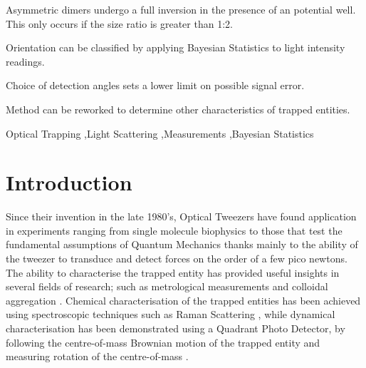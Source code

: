 \documentclass[final, 3p]{elsarticle}
\begin{document}
\begin{frontmatter}
\begin{highlights}
\item Asymmetric dimers undergo a full inversion in the presence of an potential well. This only occurs if the size ratio is greater than 1:2.  
\item Orientation can be classified by applying Bayesian Statistics to light intensity readings. 
\item Choice of detection angles sets a lower limit on possible signal error. 
\item Method can be reworked to determine other characteristics of trapped entities. 
\end{highlights}

\begin{keyword}
	Optical Trapping \sep Light Scattering \sep Measurements \sep Bayesian Statistics 
\end{keyword}

\end{frontmatter}


\section{Introduction}
\label{sec:Intro}

Since their invention in the late 1980's, Optical Tweezers have found application in experiments ranging from single molecule biophysics \cite{Bustamante2021Biophysics} to those that test the fundamental assumptions of Quantum Mechanics \cite{yin2013large} thanks mainly to the ability of the tweezer to transduce and detect forces on the order of a few pico newtons. The ability to characterise the trapped entity has provided useful insights in several fields of research; such as metrological measurements \cite{arita2020coherent} and colloidal aggregation \cite{burns1990optical}. Chemical characterisation of the trapped entities has been achieved using spectroscopic techniques such as Raman Scattering \cite{gupta2014raman}, while dynamical characterisation has been demonstrated using a Quadrant Photo Detector,  by following the centre-of-mass Brownian motion of the trapped entity  \cite{friedrich2012tuning} and measuring rotation  of the centre-of-mass \cite{yifat2021facile}. 
\end{document}
